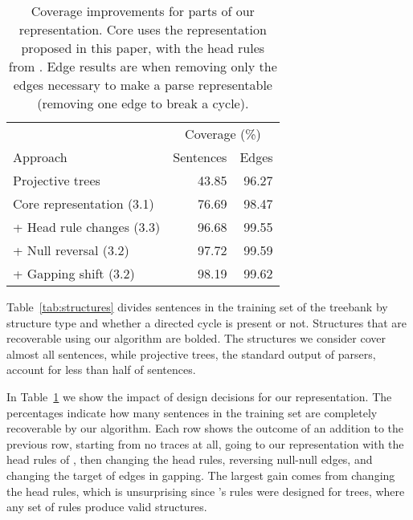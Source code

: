 \begin{table}
\centering
  \vspace{2mm}
  \begin{tabular}{|lrr|}
    \hline
    & \multicolumn{2}{c}{Coverage (\%)} \\
    Approach & Sentences & Edges \\
    \hline
    \hline
    Projective trees & 43.85 & 96.27 \\
    Core representation (3.1) & 76.69 & 98.47 \\
    + Head rule changes (3.3) & 96.68 & 99.55 \\
    + Null reversal (3.2) & 97.72 & 99.59 \\
    + Gapping shift (3.2) & 98.19 & 99.62 \\
    \hline
  \end{tabular}
  \caption{\label{tab:coverage}
    Coverage improvements for parts of our representation.
    Core uses the representation proposed in this paper, with the head rules from \textcite{cck}.
    Edge results are when removing only the edges necessary to make a parse representable (\myeg removing one edge to break a cycle).
  }
\end{table}

Table~\ref{tab:structures} divides sentences in the training set of the treebank by structure type and whether a directed cycle is present or not.
Structures that are recoverable using our algorithm are bolded.
The structures we consider cover almost all sentences, while projective trees, the standard output of parsers, account for less than half of sentences.

In Table~\ref{tab:coverage} we show the impact of design decisions for our representation.
The percentages indicate how many sentences in the training set are completely recoverable by our algorithm.
Each row shows the outcome of an addition to the previous row, starting from no traces at all, going to our representation with the head rules of \textcite{cck}, then changing the head rules, reversing null-null edges, and changing the target of edges in gapping.
The largest gain comes from changing the head rules, which is unsurprising since \textcite{cck}'s rules were designed for trees, where any set of rules produce valid structures.

